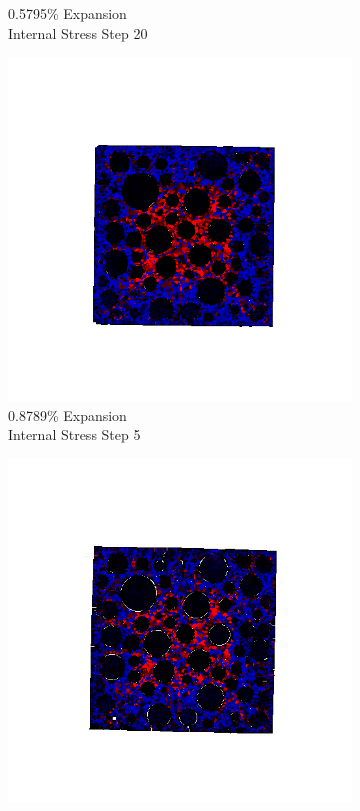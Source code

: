 \begin{figure}[ht!]
\begin{subfigure}{.25\textwidth}
      \caption{0.5795\% Expansion\\Internal Stress Step 20}
    \end{subfigure}

    \begin{subfigure}{.25\textwidth}
      \centering
      \includegraphics[width=1.0\linewidth]{Files/exp_3D/DEF/A30X0C_4_s5.png}
      \caption{0.8789\% Expansion\\Internal Stress Step 5}
    \end{subfigure}%
    \begin{subfigure}{.25\textwidth}
      \centering
      \includegraphics[width=1.0\linewidth]{Files/exp_3D/DEF/A30X0C_4_s10.png}

\end{subfigure}
\end{figure}
